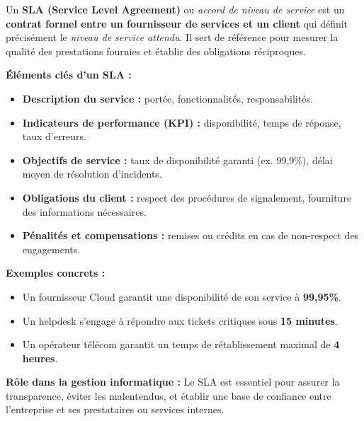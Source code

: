 \documentclass[a4paper,11pt]{article}
\begin{document}
\begin{tcolorbox}[colback=blue!5,colframe=blue!70!black,title=Qu'est-ce qu'un SLA (Service Level Agreement) ?]

Un \textbf{SLA (Service Level Agreement)} ou \textit{accord de niveau de service} est un 
\textbf{contrat formel entre un fournisseur de services et un client} qui définit précisément 
le \textit{niveau de service attendu}.  
Il sert de référence pour mesurer la qualité des prestations fournies et établir des obligations réciproques.  

\medskip
\textbf{Éléments clés d’un SLA :}
\begin{itemize}
  \item \textbf{Description du service :} portée, fonctionnalités, responsabilités.
  \item \textbf{Indicateurs de performance (KPI) :} disponibilité, temps de réponse, taux d’erreurs.
  \item \textbf{Objectifs de service :} taux de disponibilité garanti (ex. 99,9\%), délai moyen de résolution d’incidents.
  \item \textbf{Obligations du client :} respect des procédures de signalement, fourniture des informations nécessaires.
  \item \textbf{Pénalités et compensations :} remises ou crédits en cas de non-respect des engagements.
\end{itemize}

\medskip
\textbf{Exemples concrets :}
\begin{itemize}
  \item Un fournisseur Cloud garantit une disponibilité de son service à \textbf{99,95\%}.
  \item Un helpdesk s’engage à répondre aux tickets critiques sous \textbf{15 minutes}.
  \item Un opérateur télécom garantit un temps de rétablissement maximal de \textbf{4 heures}.
\end{itemize}

\medskip
\textbf{Rôle dans la gestion informatique :}  
Le SLA est essentiel pour assurer la transparence, éviter les malentendus, et établir une base de confiance entre 
l’entreprise et ses prestataires ou services internes.
\end{tcolorbox}
\end{document}
